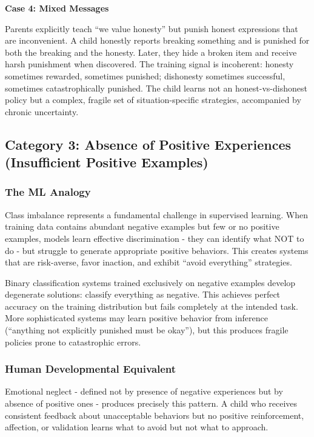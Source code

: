 \documentclass{article}
\begin{document}
\textbf{Case 4: Mixed Messages}

Parents explicitly teach ``we value honesty'' but punish honest expressions that are inconvenient. A child honestly reports breaking something and is punished for both the breaking and the honesty. Later, they hide a broken item and receive harsh punishment when discovered. The training signal is incoherent: honesty sometimes rewarded, sometimes punished; dishonesty sometimes successful, sometimes catastrophically punished. The child learns not an honest-vs-dishonest policy but a complex, fragile set of situation-specific strategies, accompanied by chronic uncertainty.

\subsection{Category 3: Absence of Positive Experiences (Insufficient Positive Examples)}

\subsubsection{The ML Analogy}

Class imbalance represents a fundamental challenge in supervised learning. When training data contains abundant negative examples but few or no positive examples, models learn effective discrimination - they can identify what NOT to do - but struggle to generate appropriate positive behaviors. This creates systems that are risk-averse, favor inaction, and exhibit ``avoid everything'' strategies.

Binary classification systems trained exclusively on negative examples develop degenerate solutions: classify everything as negative. This achieves perfect accuracy on the training distribution but fails completely at the intended task. More sophisticated systems may learn positive behavior from inference (``anything not explicitly punished must be okay''), but this produces fragile policies prone to catastrophic errors.

\subsubsection{Human Developmental Equivalent}

Emotional neglect - defined not by presence of negative experiences but by absence of positive ones - produces precisely this pattern. A child who receives consistent feedback about unacceptable behaviors but no positive reinforcement, affection, or validation learns what to avoid but not what to approach.
\end{document}
